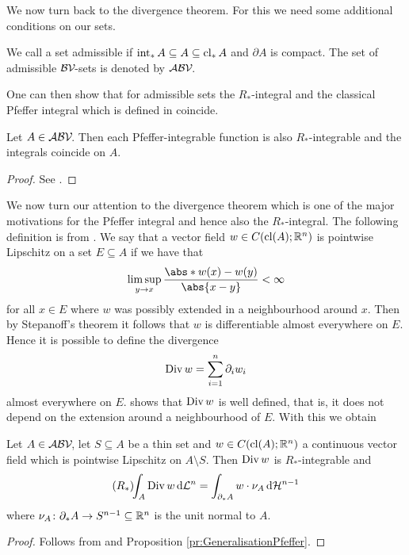 \noindent We now turn back to the divergence theorem. For this we need some additional conditions on our sets.

\begin{definition}
We call a set admissible if $\operatorname{int}_*A\subseteq A\subseteq \operatorname{cl}_*A$ and $\partial A$ is compact. The set of admissible $\mathcal{BV\!}$-sets is denoted by $\mathcal{ABV\!}$.
\end{definition}

\noindent
One can then show that for admissible sets the $R_*$-integral and the classical Pfeffer integral which is defined in \cite{Pfe1992} coincide.

\begin{proposition}\label{pr:GeneralisationPfeffer}
Let $A\in\mathcal{ABV\!}$. Then each Pfeffer-integrable function is also $R_*$-integrable and the integrals coincide on $A$.
\end{proposition}
\begin{proof}
See \cite[Corollary 3.18]{Pfe2016}.
\end{proof}

\noindent We now turn our attention to the divergence theorem which is one of the major motivations for the Pfeffer integral and hence also the $R_*$-integral.
The following definition is from \cite{Pfe1991}.
We say that a vector field $w\in C(\operatorname{cl}(A);\mathbb{R}^n)$ is pointwise Lipschitz on a set $E\subseteq A$ if we have that
\begin{align*}
	\limsup_{y\to x}\frac{\abs*{w(x)-w(y)}}{\abs{x-y}}<\infty
\end{align*}
for all $x\in E$ where $w$ was possibly extended in a neighbourhood around $x$. Then by Stepanoff's theorem it follows that $w$ is differentiable almost everywhere on $E$. Hence it is possible to define the divergence
\begin{align*}
	\operatorname{Div} w=\sum_{i=1}^n\partial_iw_i
\end{align*}
almost everywhere on $E$. \cite[Lemma 5.16]{Pfe1991} shows that $\operatorname{Div} w$ is well defined, that is, it does not depend on the extension around a neighbourhood of $E$. With this we obtain

\begin{theorem}\label{th:divergence}
Let $A\in\mathcal{ABV\!}$, let $S\subseteq A$ be a thin set and $w\in C(\operatorname{cl}(A);\mathbb{R}^n)$ a continuous vector field which is pointwise Lipschitz on $A\setminus S$. Then $\operatorname{Div} w$ is $R_*$-integrable and
\begin{align*}
	(R_*)\!\!\int_A\operatorname{Div} w\,\mathrm{d} \mathcal{L}^n=\int_{\partial_* A}w\cdot \nu_A\,\mathrm{d} \mathcal{H}^{n-1}
\end{align*}
where $\nu_A\colon \partial_* A\to S^{n-1}\subseteq\mathbb{R}^n$ is the unit normal to $A$.
\end{theorem}
\begin{proof}
Follows from \cite[Theorem 5.19]{Pfe1991} and Proposition \ref{pr:GeneralisationPfeffer}.
\end{proof}

